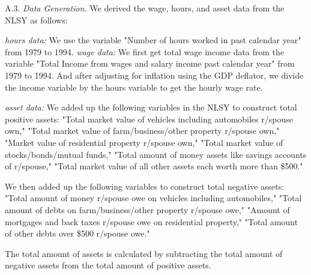 \documentclass{article}
\begin{document}
\label{appendixA3}
\bigskip
\quad A.3.     \textit{Data Generation.}     We derived the wage, hours, and asset data from the NLSY as follows: \par
\medskip
\noindent \textit{hours data:} We use the variable "Number of hours worked in past calendar year" from 1979 to 1994.
\noindent \textit{wage data:} We first get total wage income data from the variable "Total Income from wages and salary income past calendar year" from 1979 to 1994. And after adjusting for inflation using the GDP deflator, we divide the income variable by the hours variable to get the hourly wage rate. \par
\noindent \textit{asset data:} We added up the following variables in the NLSY to construct total positive assets: "Total market value of vehicles including automobiles r/spouse own," "Total market value of farm/business/other property r/spouse own," "Market value of residential property r/spouse own," "Total market value of stocks/bonds/mutual funds," "Total amount of money assets like savings accounts of r/spouse," "Total market value of all other assets each worth more than \$500." \par
We then added up the following variables to construct total negative assets: "Total amount of money r/spouse owe on vehicles including automobiles," "Total amount of debts on farm/business/other property r/spouse owe," "Amount of mortgages and back taxes r/spouse owe on residential property," "Total amount of other debts over \$500 r/spouse owe." \par
The total amount of assets is calculated by subtracting the total amount of negative assets from the total amount of positive assets.
\end{document}
